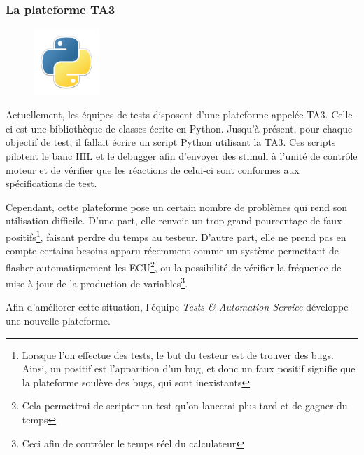 			\subsubsection{La plateforme TA3}\label{ta3}
			\begin{figure}
				\includegraphics[width=2.5cm]{contents/images/python.png}
			\end{figure}
			Actuellement, les équipes de tests disposent d'une plateforme appelée TA3. Celle-ci est une bibliothèque de classes écrite en Python. Jusqu'à présent, pour chaque objectif de test, il fallait écrire un script Python utilisant la TA3. Ces scripts pilotent le banc HIL et le debugger afin d'envoyer des stimuli à l'unité de contrôle moteur et de vérifier que les réactions de celui-ci sont conformes aux spécifications de test.
			
			Cependant, cette plateforme pose un certain nombre de problèmes qui rend son utilisation difficile. D'une part, elle renvoie un trop grand pourcentage de faux-positifs\footnote{Lorsque l'on effectue des tests, le but du testeur est de trouver des bugs. Ainsi, un positif est l'apparition d'un bug, et donc un faux positif signifie que la plateforme soulève des bugs, qui sont inexistants}, faisant perdre du temps au testeur. D'autre part, elle ne prend pas en compte certains besoins apparu récemment comme un système permettant de flasher automatiquement les ECU\footnote{Cela permettrai de scripter un test qu'on lancerai plus tard et de gagner du temps}, ou la possibilité de vérifier la fréquence de mise-à-jour de la production de variables\footnote{Ceci afin de contrôler le temps réel du calculateur}.
			
			Afin d'améliorer cette situation, l'équipe \textit{Tests \& Automation Service} développe une nouvelle plateforme.
			
